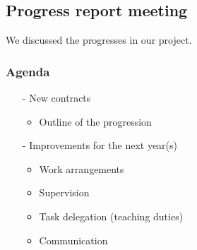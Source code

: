 \subsection{Progress report meeting}
\label{task:20180126_cj1}

We discussed the progresses in our project. 

\subsubsection{Agenda}
\begin{enumerate}
    \item[-] New contracts
        \begin{itemize}
        \item Outline of the progression
        \end{itemize}
    \item[-] Improvements for the next year(s)
    \begin{itemize}
        \item Work arrangements
        \item Supervision
        \item Task delegation (teaching duties)
        \item Communication
    \end{itemize}
\end{enumerate}
